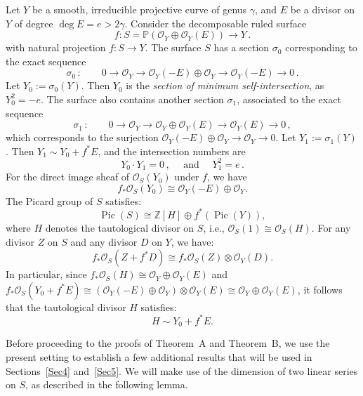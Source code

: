 \documentclass[a4paper,12pt]{amsart}
\def\Pic{\operatorname{Pic}}%
\begin{document}
Let $Y$ be a smooth, irreducible projective curve of genus $\gamma$, and $E$ be a divisor on $Y$ of degree $\deg E = e > 2\gamma$. Consider the decomposable ruled surface
\begin{equation*}\label{Sec2_f-S-Y}
 f : S = \mathbb{P} (\mathcal{O}_Y  \oplus \mathcal{O}_Y (E)) \to Y \, .
\end{equation*}
with natural projection $f : S \to Y$. The surface $S$ has a section $\sigma_0$ corresponding to the exact sequence
\[
 \sigma_0 \, : \qquad 0 \to \mathcal{O}_Y \to \mathcal{O}_Y(-E) \oplus \mathcal{O}_Y \to \mathcal{O}_Y(-E) \to 0 \, .
\]
Let $Y_0 := \sigma_0 (Y)$. Then $Y_0$ is the \emph{section of minimum self-intersection}, as $Y^2_0 = -e$.
The surface also contains another section $\sigma_1$, associated to the exact sequence
\[
 \sigma_1 \, : \qquad 0 \to \mathcal{O}_Y \to \mathcal{O}_Y \oplus \mathcal{O}_Y(E) \to \mathcal{O}_Y(E) \to 0 \, ,
\]
which corresponds to the surjection
$
 \mathcal{O}_Y(-E) \oplus \mathcal{O}_Y \to \mathcal{O}_Y \to 0
$.
Let $Y_1 := \sigma_1 (Y)$. Then $Y_1 \sim Y_0 + f^{\ast} E$, and the intersection numbers are
\[
 Y_0 \cdot Y_1 = 0 \, , \quad \mbox{ and } \quad
 Y^2_1 = e \, .
\]
For the direct image sheaf of $\mathcal{O}_S (Y_0)$ under $f$, we have
\begin{equation*}\label{Sec2_f*OS(Y0)}
 f_{\ast} \mathcal{O}_S (Y_0) \cong \mathcal{O}_Y (-E) \oplus \mathcal{O}_Y .
\end{equation*}
The Picard group of $S$ satisfies:
\[
 \Pic (S) \cong \mathbb{Z} [H] \oplus f^{\ast} (\Pic (Y)) ,
\]
where $H$ denotes the tautological divisor on $S$, i.e., $\mathcal{O}_S (1) \cong \mathcal{O}_S (H)$.
For any divisor $Z$ on $S$ and any divisor $D$ on $Y$, we have:
\begin{equation*}\label{Sec2_f*OS(Z+f*D)}
 f_{\ast} \mathcal{O}_S (Z+f^{\ast}D) \cong f_{\ast} \mathcal{O}_S (Z) \otimes \mathcal{O}_Y (D) .
\end{equation*}
In particular, since
$
  f_{\ast} \mathcal{O}_S (H) \cong \mathcal{O}_Y \oplus \mathcal{O}_Y (E)
$
 and
$
f_{\ast} \mathcal{O}_S (Y_0 + f^{\ast} E) \cong (\mathcal{O}_Y (-E)\oplus \mathcal{O}_Y) \otimes \mathcal{O}_Y (E) \cong \mathcal{O}_Y \oplus \mathcal{O}_Y (E)
$,
it follows that the tautological divisor $H$ satisfies:
\begin{equation*}\label{Sec2_H}
 H \sim Y_0 + f^{\ast} E .
\end{equation*}

Before proceeding to the proofs of \textnormal{Theorem~A} and \textnormal{Theorem~B}, we use the present setting to establish a few additional results that will be used in Sections~\ref{Sec4} and~\ref{Sec5}.
We will make use of the dimension of two linear series on $S$, as described in the following lemma.
\end{document}
